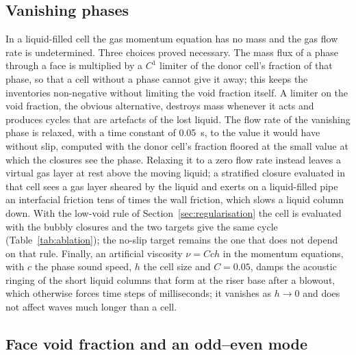 \documentclass[a4paper,fleqn]{cas-sc}
\begin{document}
\subsection{Vanishing phases}\label{sec:vanishing}

In a liquid-filled cell the gas momentum equation has no mass and the gas flow rate is undetermined. Three choices proved necessary. The mass flux of a phase through a face is multiplied by a $C^1$ limiter of the donor cell's fraction of that phase, so that a cell without a phase cannot give it away; this keeps the inventories non-negative without limiting the void fraction itself. A limiter on the void fraction, the obvious alternative, destroys mass whenever it acts and produces cycles that are artefacts of the lost liquid. The flow rate of the vanishing phase is relaxed, with a time constant of \SI{0.05}{\second}, to the value it would have without slip, computed with the donor cell's fraction floored at the small value at which the closures see the phase. Relaxing it to a zero flow rate instead leaves a virtual gas layer at rest above the moving liquid; a stratified closure evaluated in that cell sees a gas layer sheared by the liquid and exerts on a liquid-filled pipe an interfacial friction tens of times the wall friction, which slows a liquid column down. With the low-void rule of Section~\ref{sec:regularisation} the cell is evaluated with the bubbly closures and the two targets give the same cycle (Table~\ref{tab:ablation}); the no-slip target remains the one that does not depend on that rule. Finally, an artificial viscosity $\nu = C c h$ in the momentum equations, with $c$ the phase sound speed, $h$ the cell size and $C = 0.05$, damps the acoustic ringing of the short liquid columns that form at the riser base after a blowout, which otherwise forces time steps of milliseconds; it vanishes as $h \to 0$ and does not affect waves much longer than a cell.

\subsection{Face void fraction and an odd--even mode}\label{sec:oddeven}
\end{document}
